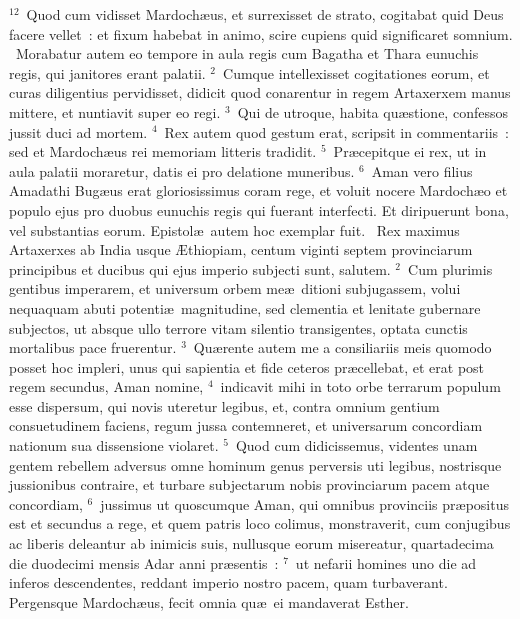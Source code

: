 ${}^{12}$~Quod cum vidisset Mardoch\ae us, et surrexisset de strato, cogitabat quid Deus facere vellet~: et fixum habebat in animo, scire cupiens quid significaret somnium.
~\lettrine[lines=10,image=true,loversize=0.05,lraise=-0.03]{M}{}orabatur autem eo tempore in aula regis cum Bagatha et Thara eunuchis regis, qui janitores erant palatii.
${}^{2}$~Cumque intellexisset cogitationes eorum, et curas diligentius pervidisset, didicit quod conarentur in regem Artaxerxem manus mittere, et nuntiavit super eo regi.
${}^{3}$~Qui de utroque, habita qu\ae stione, confessos jussit duci ad mortem.
${}^{4}$~Rex autem quod gestum erat, scripsit in commentariis~: sed et Mardoch\ae us rei memoriam litteris tradidit.
${}^{5}$~Pr\ae cepitque ei rex, ut in aula palatii moraretur, datis ei pro delatione muneribus.
${}^{6}$~Aman vero filius Amadathi Bug\ae us erat gloriosissimus coram rege, et voluit nocere Mardoch\ae o et populo ejus pro duobus eunuchis regis qui fuerant interfecti. Et diripuerunt bona, vel substantias eorum. Epistol\ae\ autem hoc exemplar fuit.
~\lettrine[lines=10,image=true,loversize=0.05,lraise=-0.03]{R}{}ex maximus Artaxerxes ab India usque \AE thiopiam, centum viginti septem provinciarum principibus et ducibus qui ejus imperio subjecti sunt, salutem.
${}^{2}$~Cum plurimis gentibus imperarem, et universum orbem me\ae\ ditioni subjugassem, volui nequaquam abuti potenti\ae\ magnitudine, sed clementia et lenitate gubernare subjectos, ut absque ullo terrore vitam silentio transigentes, optata cunctis mortalibus pace fruerentur.
${}^{3}$~Qu\ae rente autem me a consiliariis meis quomodo posset hoc impleri, unus qui sapientia et fide ceteros pr\ae cellebat, et erat post regem secundus, Aman nomine,
${}^{4}$~indicavit mihi in toto orbe terrarum populum esse dispersum, qui novis uteretur legibus, et, contra omnium gentium consuetudinem faciens, regum jussa contemneret, et universarum concordiam nationum sua dissensione violaret.
${}^{5}$~Quod cum didicissemus, videntes unam gentem rebellem adversus omne hominum genus perversis uti legibus, nostrisque jussionibus contraire, et turbare subjectarum nobis provinciarum pacem atque concordiam,
${}^{6}$~jussimus ut quoscumque Aman, qui omnibus provinciis pr\ae positus est et secundus a rege, et quem patris loco colimus, monstraverit, cum conjugibus ac liberis deleantur ab inimicis suis, nullusque eorum misereatur, quartadecima die duodecimi mensis Adar anni pr\ae sentis~:
${}^{7}$~ut nefarii homines uno die ad inferos descendentes, reddant imperio nostro pacem, quam turbaverant. Pergensque Mardoch\ae us, fecit omnia qu\ae\ ei mandaverat Esther.


